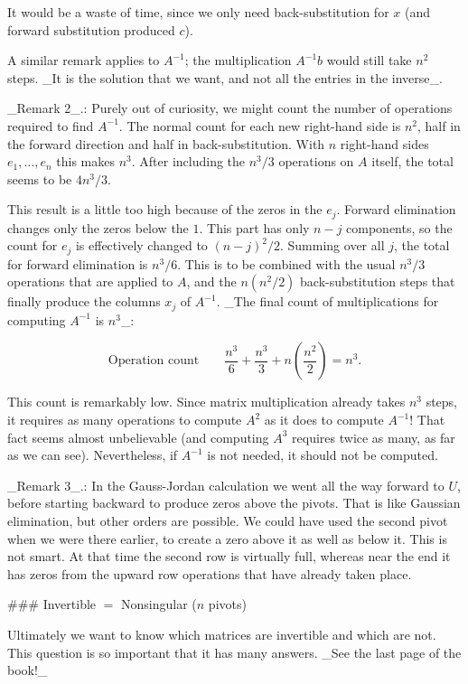 It would be a waste of time, since we only need back-substitution for \(x\) (and forward substitution produced \(c\)).

A similar remark applies to \(A^{-1}\); the multiplication \(A^{-1}b\) would still take \(n^{2}\) steps. _It is the solution that we want, and not all the entries in the inverse_.

_Remark 2_.: Purely out of curiosity, we might count the number of operations required to find \(A^{-1}\). The normal count for each new right-hand side is \(n^{2}\), half in the forward direction and half in back-substitution. With \(n\) right-hand sides \(e_{1},\ldots,e_{n}\) this makes \(n^{3}\). After including the \(n^{3}/3\) operations on \(A\) itself, the total seems to be \(4n^{3}/3\).

This result is a little too high because of the zeros in the \(e_{j}\). Forward elimination changes only the zeros below the \(1\). This part has only \(n-j\) components, so the count for \(e_{j}\) is effectively changed to \((n-j)^{2}/2\). Summing over all \(j\), the total for forward elimination is \(n^{3}/6\). This is to be combined with the usual \(n^{3}/3\) operations that are applied to \(A\), and the \(n(n^{2}/2)\) back-substitution steps that finally produce the columns \(x_{j}\) of \(A^{-1}\). _The final count of multiplications for computing \(A^{-1}\) is \(n^{3}\)_:

\[\text{Operation count}\qquad\frac{n^{3}}{6}+\frac{n^{3}}{3}+n\left(\frac{n^{2}}{ 2}\right)=n^{3}.\]

This count is remarkably low. Since matrix multiplication already takes \(n^{3}\) steps, it requires as many operations to compute \(A^{2}\) as it does to compute \(A^{-1}\)! That fact seems almost unbelievable (and computing \(A^{3}\) requires twice as many, as far as we can see). Nevertheless, if \(A^{-1}\) is not needed, it should not be computed.

_Remark 3_.: In the Gauss-Jordan calculation we went all the way forward to \(U\), before starting backward to produce zeros above the pivots. That is like Gaussian elimination, but other orders are possible. We could have used the second pivot when we were there earlier, to create a zero above it as well as below it. This is not smart. At that time the second row is virtually full, whereas near the end it has zeros from the upward row operations that have already taken place.

### Invertible \(=\) Nonsingular (\(n\) pivots)

Ultimately we want to know which matrices are invertible and which are not. This question is so important that it has many answers. _See the last page of the book!_

